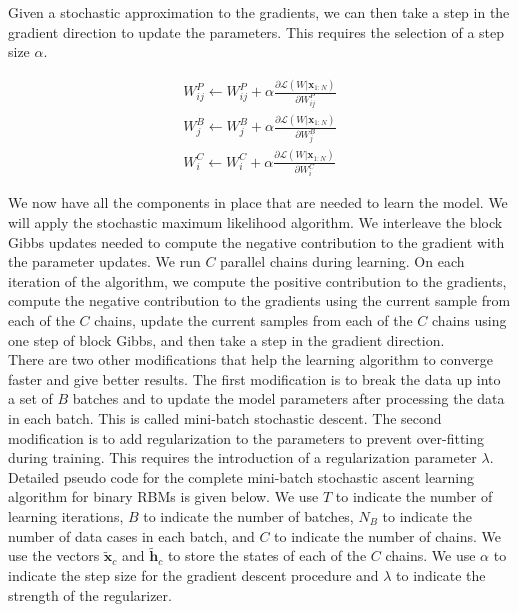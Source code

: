 \documentclass[11pt]{article}
\newcommand{\deriv}[2]{\frac{\partial{#1}}{\partial {#2}} }
\newcommand{\mbf}[1]{{\mathbf{#1}}}
\begin{document}
Given a stochastic approximation to the gradients, we can then take a step in the gradient direction to update the parameters. This requires the selection of a step size $\alpha$.

\begin{align}
\label{update_WP}
W^P_{ij} \leftarrow W^P_{ij} + \alpha \deriv{\mathcal{L}(W|\mbf{x}_{1:N})}{W^P_{ij}}\\
\label{update_WB}
W^B_{j} \leftarrow W^B_{j} + \alpha \deriv{\mathcal{L}(W|\mbf{x}_{1:N})}{W^B_{j}}\\
\label{update_WC}
W^C_{i} \leftarrow W^C_{i} + \alpha \deriv{\mathcal{L}(W|\mbf{x}_{1:N})}{W^C_{i}}
\end{align}

We now have all the components in place that are needed to learn the model. We will apply the stochastic
maximum likelihood algorithm. We interleave the block Gibbs updates needed to compute the negative contribution to the gradient with the parameter updates. We run $C$ parallel chains during learning. On each iteration of the algorithm, we compute the positive contribution to the gradients, compute the negative contribution to the gradients using the current sample from each of the $C$ chains, update the current samples from each of the $C$ chains using one step of block Gibbs, and then take a step in the gradient direction.\\

There are two other modifications that help the learning algorithm  to converge faster and give better results. The first modification is to break the data up into a set of $B$ batches and to update the model parameters after processing the data in each batch. This is called mini-batch stochastic descent. The second modification is to add regularization to the parameters to prevent over-fitting during training. This requires the introduction of a regularization parameter $\lambda$.\\

Detailed pseudo code for the complete mini-batch stochastic ascent learning algorithm for binary RBMs is given below. We use $T$ to indicate the number of learning iterations, $B$ to indicate the number of batches, $N_B$ to indicate the number of data cases in each batch, and $C$ to indicate the number of chains. We use the vectors $\tilde{\mbf{x}}_c$ and $\tilde{\mbf{h}}_c$ to store the states of each of the $C$ chains. We use $\alpha$ to indicate the step size for the gradient descent procedure and $\lambda$ to indicate the strength of the regularizer.
\end{document}
